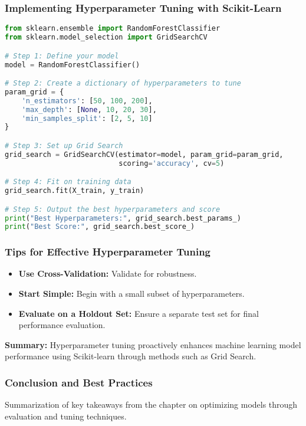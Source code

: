 \documentclass{beamer}
\begin{document}
\begin{frame}[fragile]
    \frametitle{Implementing Hyperparameter Tuning with Scikit-Learn}
    \begin{lstlisting}[language=Python]
from sklearn.ensemble import RandomForestClassifier
from sklearn.model_selection import GridSearchCV

# Step 1: Define your model
model = RandomForestClassifier()

# Step 2: Create a dictionary of hyperparameters to tune
param_grid = {
    'n_estimators': [50, 100, 200],
    'max_depth': [None, 10, 20, 30],
    'min_samples_split': [2, 5, 10]
}

# Step 3: Set up Grid Search
grid_search = GridSearchCV(estimator=model, param_grid=param_grid, 
                           scoring='accuracy', cv=5)

# Step 4: Fit on training data
grid_search.fit(X_train, y_train)

# Step 5: Output the best hyperparameters and score
print("Best Hyperparameters:", grid_search.best_params_)
print("Best Score:", grid_search.best_score_)
    \end{lstlisting}
\end{frame}

\begin{frame}[fragile]
    \frametitle{Tips for Effective Hyperparameter Tuning}
    \begin{itemize}
        \item \textbf{Use Cross-Validation:} Validate for robustness.
        \item \textbf{Start Simple:} Begin with a small subset of hyperparameters.
        \item \textbf{Evaluate on a Holdout Set:} Ensure a separate test set for final performance evaluation.
    \end{itemize}
    
    \textbf{Summary:} 
    Hyperparameter tuning proactively enhances machine learning model performance using Scikit-learn through methods such as Grid Search.
\end{frame}

\begin{frame}[fragile]
    \frametitle{Conclusion and Best Practices}
    Summarization of key takeaways from the chapter on optimizing models through evaluation and tuning techniques.
\end{frame}
\end{document}
